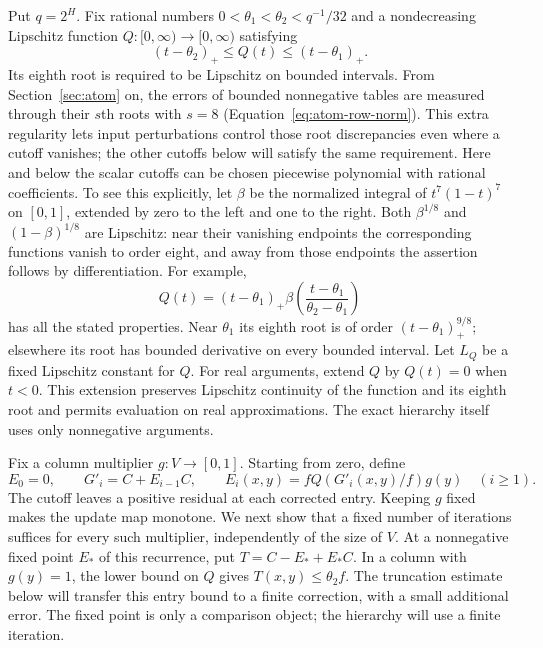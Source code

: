 Put $q=2^H$.  Fix rational numbers
$0<\theta_1<\theta_2<q^{-1}/32$ and a nondecreasing Lipschitz function
$Q:[0,\infty)\to[0,\infty)$ satisfying
\begin{equation}
 (t-\theta_2)_+\leq Q(t)\leq(t-\theta_1)_+.
 \label{eq:hier-Q}
\end{equation}
Its eighth root is required to be Lipschitz on bounded intervals.
From Section~\ref{sec:atom} on, the errors of bounded nonnegative tables
are measured through their $s$th roots with $s=8$
(Equation~\eqref{eq:atom-row-norm}). This extra regularity lets input
perturbations control those root discrepancies even where a cutoff
vanishes; the other cutoffs below will satisfy the same requirement.
Here and below the scalar cutoffs can be chosen piecewise polynomial with
rational coefficients.  To see this explicitly, let $\beta$ be the
normalized integral of $t^7(1-t)^7$ on $[0,1]$, extended by zero to the
left and one to the right.  Both $\beta^{1/8}$ and
$(1-\beta)^{1/8}$ are Lipschitz: near their vanishing endpoints the
corresponding functions vanish to order eight, and away from those
endpoints the assertion follows by differentiation.  For example,
\[
 Q(t)=(t-\theta_1)_+
       \beta\left(\frac{t-\theta_1}{\theta_2-\theta_1}\right)
\]
has all the stated properties.  Near $\theta_1$ its eighth root is of
order $(t-\theta_1)_+^{9/8}$; elsewhere its root has bounded derivative
on every bounded interval.  Let $L_Q$ be a fixed Lipschitz constant for
$Q$.  For real arguments, extend $Q$ by $Q(t)=0$ when $t<0$.
This extension preserves Lipschitz continuity of the function and its eighth root and
permits evaluation on real approximations.  The exact hierarchy itself
uses only nonnegative arguments.

Fix a column multiplier $g:V\to[0,1]$.  Starting from zero, define
\begin{equation}
 E_0=0,\qquad G'_i=C+E_{i-1}C,\qquad
 E_i(x,y)=fQ(G'_i(x,y)/f)g(y)\quad(i\ge1).
 \label{eq:hier-fixed-g-iteration}
\end{equation}
The cutoff leaves a positive residual at each corrected entry.  Keeping
$g$ fixed makes the update map monotone.  We next show that a fixed
number of iterations suffices for every such multiplier, independently
of the size of $V$.  At a nonnegative fixed point $E_*$ of this recurrence, put
$T=C-E_*+E_*C$.  In a column with $g(y)=1$, the lower bound on $Q$
gives $T(x,y)\le\theta_2f$.  The truncation estimate below will transfer
this entry bound to a finite correction, with a small additional error.
The fixed point is only a comparison object; the hierarchy will use a
finite iteration.

